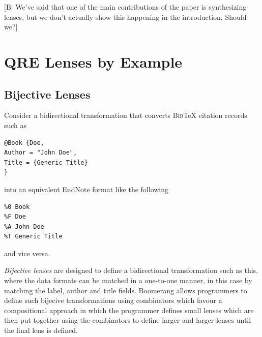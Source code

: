 \documentclass[acmsmall,review,anonymous]{acmart}
\newcommand{\FINISH}[3]{\ifdraft\textcolor{#1}{[#2: #3]}\fi}
\newcommand{\bcp}[1]{\FINISH{dkred}{B}{#1}}
\newcommand{\bibtex}{\textsc{Bib}\TeX{}}
\begin{document}
\bcp{We've said that one of the main contributions of the paper is
synthesizing lenses, but we don't actually show this happening in the
introduction.  Should we?}

\section{QRE Lenses by Example}
\label{sec:example}
\subsection{Bijective Lenses}
Consider a bidirectional transformation that converts \bibtex{} citation records
such as
\begin{verbatim}
@Book {Doe,
Author = "John Doe",
Title = {Generic Title}
}
\end{verbatim}
\noindent
into an equivalent EndNote format like the following
\begin{verbatim}
%0 Book
%F Doe
%A John Doe
%T Generic Title
\end{verbatim}
\noindent
and vice versa. 

{\em Bijective lenses} are designed to define a bidirectional transformation
such as this, where the data formats can be matched in a one-to-one manner, in
this case by matching the label, author and title fields. Boomerang allows
programmers to define such bijecive transformations using combinators which
favour a compositional approach in which the programmer defines small lenses
which are then put together using the combinators to define larger and larger
lenses until the final lens is defined. 
\end{document}
